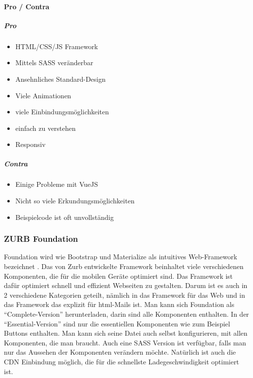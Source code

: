 		\paragraph{Pro / Contra}
		\subparagraph{Pro}
		\begin{itemize}
			\item HTML/CSS/JS Framework
			\item Mittels SASS veränderbar
			\item Ansehnliches Standard-Design 
			\item Viele Animationen
			\item viele Einbindungsmöglichkeiten
			\item einfach zu verstehen
			\item Responsiv
		\end{itemize}
		\subparagraph{Contra}
		\begin{itemize}
			\item Einige Probleme mit VueJS
			\item Nicht so viele Erkundungsmöglichkeiten
			\item Beispielcode ist oft unvollständig
		\end{itemize}
	
		\subsubsection{ZURB Foundation}
		Foundation wird wie Bootstrap und Materialize als intuitives Web-Framework bezeichnet \cite{foundation-intro}. Das von Zurb entwickelte Framework beinhaltet viele verschiedenen Komponenten, die für die mobilen Geräte optimiert sind. Das Framework ist dafür optimiert schnell und effizient Webseiten zu gestalten. Darum ist es auch in 2 verschiedene Kategorien geteilt, nämlich in das Framework für das Web und in das Framework das explizit für html-Mails ist. Man kann sich Foundation als \enquote{Complete-Version} herunterladen, darin sind alle Komponenten enthalten. In der \enquote{Essential-Version} sind nur die essentiellen Komponenten wie zum Beispiel Buttons enthalten. Man kann sich seine Datei auch selbst konfigurieren, mit allen Komponenten, die man braucht. Auch eine SASS Version ist verfügbar, falls man nur das Aussehen der Komponenten verändern möchte. Natürlich ist auch die CDN Einbindung möglich, die für die schnellste Ladegeschwindigkeit optimiert ist.
